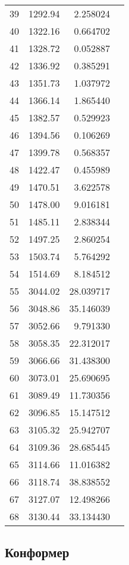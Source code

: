 \begin{tabular}{r|rr|l}
39 &     1292.94  &  2.258024  & \\
40 &     1322.16  &  0.664702  & \\
41 &     1328.72  &  0.052887  & \\
42 &     1336.92  &  0.385291  & \\
43 &     1351.73  &  1.037972  & \\
44 &     1366.14  &  1.865440  & \\
45 &     1382.57  &  0.529923  & \\
46 &     1394.56  &  0.106269  & \\
47 &     1399.78  &  0.568357  & \\
48 &     1422.47  &  0.455989  & \\
49 &     1470.51  &  3.622578  & \\
50 &     1478.00  &  9.016181  & \\
51 &     1485.11  &  2.838344  & \\
52 &     1497.25  &  2.860254  & \\
53 &     1503.74  &  5.764292  & \\
54 &     1514.69  &  8.184512  & \\
55 &     3044.02  & 28.039717  & \\
56 &     3048.86  & 35.146039  & \\
57 &     3052.66  &  9.791330  & \\
58 &     3058.35  & 22.312017  & \\
59 &     3066.66  & 31.438300  & \\
60 &     3073.01  & 25.690695  & \\
61 &     3089.49  & 11.730356  & \\
62 &     3096.85  & 15.147512  & \\
63 &     3105.32  & 25.942707  & \\
64 &     3109.36  & 28.685445  & \\
65 &     3114.66  & 11.016382  & \\
66 &     3118.74  & 38.838552  & \\
67 &     3127.07  & 12.498266  & \\
68 &     3130.44  & 33.134430  & \\
  \bottomrule
\end{tabular}

\subsection{Конформер \CC{}}

